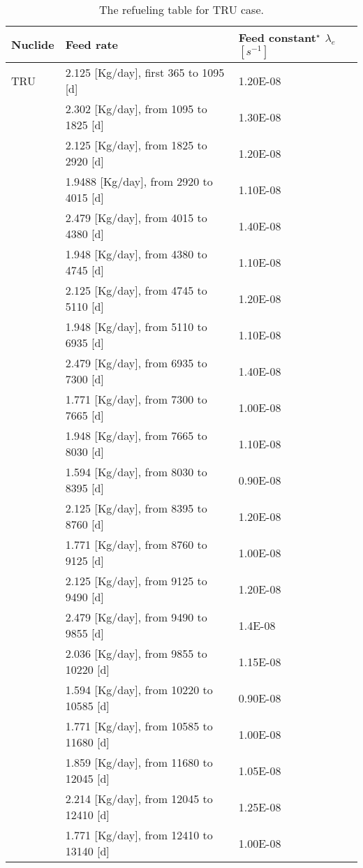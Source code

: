 \begin{table}[ht!]
	\centering
	\caption{The refueling table for TRU case.} 
	\vspace{1ex}
	\begin{tabularx}{\textwidth}{|p{1.5cm}|b|p{1.9cm}|}
		\hline
		\textbf{Nuclide} & \textbf{Feed rate} & \textbf{Feed constant$^{\star}$} $\lambda_{e}$ $[s^{-1}]$ \\
		\hline
		TRU        &  2.125 [Kg/day], first 365 to 1095  [d] & 1.20E-08 \\
		&  2.302  [Kg/day], from 1095 to 1825 [d] & 		1.30E-08 \\
		&  2.125  [Kg/day], from 1825 to 2920 [d] & 		1.20E-08 \\
		&  1.9488 [Kg/day], from 2920 to 4015 [d]& 		1.10E-08	\\
		&  2.479 [Kg/day], from 4015 to 4380 [d] &		1.40E-08	\\
		&  1.948 [Kg/day], from 4380 to 4745 [d] &		1.10E-08	\\
		&  2.125   [Kg/day], from 4745 to 5110 [d] &	1.20E-08	\\
		&  1.948   [Kg/day], from 5110 to 6935 [d]&		1.10E-08		\\
		&  2.479  [Kg/day], from 6935 to 7300 [d]&		1.40E-08	 \\ 
		&  1.771   [Kg/day], from 7300 to 7665 [d]&		1.00E-08	 \\ 
		&  1.948   [Kg/day], from 7665 to 8030 [d]&		1.10E-08	 \\ 
		&  1.594   [Kg/day], from 8030 to 8395 [d]&		0.90E-08	 \\
		&  2.125   [Kg/day], from 8395 to 8760 [d]&		1.20E-08	 \\
		&  1.771  [Kg/day], from 8760 to 9125 [d]&		1.00E-08	 \\
		& 2.125  [Kg/day], from 9125 to 9490 [d]&		1.20E-08	 \\
		&  2.479  [Kg/day], from 9490 to 9855 [d]&		1.4E-08	 \\
		&   2.036 [Kg/day], from 9855 to 10220 [d]&		1.15E-08	 \\
		&  1.594 [Kg/day], from 10220 to 10585 [d]&		0.90E-08	 \\
		&   1.771  [Kg/day], from 10585 to 11680 [d]&		1.00E-08	 \\
		&  1.859   [Kg/day], from 11680 to 12045 [d]&		1.05E-08	 \\
		& 2.214    [Kg/day], from 12045 to 12410 [d]&		1.25E-08	 \\
		&  1.771   [Kg/day], from 12410 to 13140 [d]&		1.00E-08	 \\

\end{tabularx}
\end{table}

